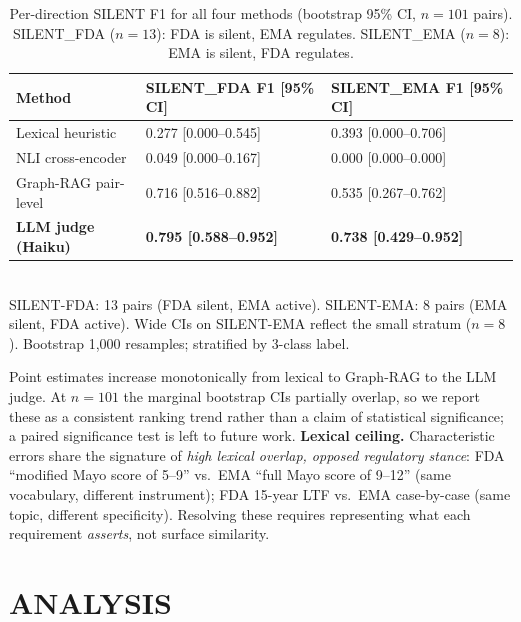 \documentclass[manuscript]{acmart}
\makeatletter
\let\@acmt@@section\section
\renewcommand{\section}[1]{%
  \@acmt@@section{\texorpdfstring{\MakeUppercase{#1}}{#1}}}
\makeatother
\begin{document}
\begin{table}[h]
  \caption{Per-direction SILENT F1 for all four methods (bootstrap 95\% CI,
    $n=101$ pairs). SILENT\_FDA ($n=13$): FDA is silent, EMA regulates.
    SILENT\_EMA ($n=8$): EMA is silent, FDA regulates.}
  \label{tab:silent_direction}
  \small
  \begin{tabular}{lll}
    \toprule
    Method & SILENT\_FDA F1 [95\% CI] & SILENT\_EMA F1 [95\% CI] \\
    \midrule
    Lexical heuristic
      & 0.277 [0.000--0.545] & 0.393 [0.000--0.706] \\
    NLI cross-encoder
      & 0.049 [0.000--0.167] & 0.000 [0.000--0.000] \\
    Graph-RAG pair-level
      & 0.716 [0.516--0.882] & 0.535 [0.267--0.762] \\
    \textbf{LLM judge (Haiku)}
      & \textbf{0.795 [0.588--0.952]} & \textbf{0.738 [0.429--0.952]} \\
    \bottomrule
  \end{tabular}
  \smallskip\\
  {\small SILENT-FDA: 13 pairs (FDA silent, EMA active). SILENT-EMA: 8 pairs
    (EMA silent, FDA active). Wide CIs on SILENT-EMA reflect the small stratum
    ($n=8$). Bootstrap 1{,}000 resamples; stratified by 3-class label.}
\end{table}

Point estimates increase monotonically from lexical to Graph-RAG to the LLM
judge. At $n = 101$ the marginal bootstrap CIs partially overlap, so we report
these as a consistent ranking trend rather than a claim of statistical
significance; a paired significance test is left to future work.
\textbf{Lexical ceiling.} Characteristic errors share the signature of
\textit{high lexical overlap, opposed regulatory stance}: FDA
``modified Mayo score of 5--9'' vs.\ EMA ``full Mayo score of 9--12''
(same vocabulary, different instrument); FDA 15-year LTF vs.\ EMA
case-by-case (same topic, different specificity). Resolving these requires
representing what each requirement \textit{asserts}, not surface similarity.

\section{Analysis}
\label{sec:discussion}
\end{document}
